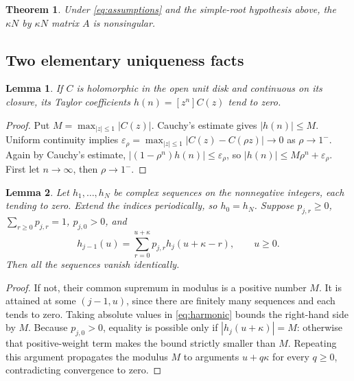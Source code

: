 \documentclass[11pt]{article}
\newtheorem{theorem}{Theorem}
\newtheorem{lemma}{Lemma}
\begin{document}
\begin{theorem}\label{thm:main}
Under \eqref{eq:assumptions} and the simple-root hypothesis above,
the $\kappa N$ by $\kappa N$ matrix $A$ is nonsingular.
\end{theorem}

\subsection*{Two elementary uniqueness facts}
\begin{lemma}\label{lem:coefficients}
If $C$ is holomorphic in the open unit disk and continuous on its
closure, its Taylor coefficients $h(n)=[z^n]C(z)$ tend to zero.
\end{lemma}
\begin{proof}
Put $M=\max_{|z|\leq1}|C(z)|$. Cauchy's estimate gives $|h(n)|\leq M$.
Uniform continuity implies
$\varepsilon_\rho=\max_{|z|\leq1}|C(z)-C(\rho z)|\to0$ as
$\rho\to1^-$. Again by Cauchy's estimate,
$|(1-\rho^n)h(n)|\leq\varepsilon_\rho$, so
$|h(n)|\leq M\rho^n+\varepsilon_\rho$.
First let $n\to\infty$, then $\rho\to1^-$.
\end{proof}

\begin{lemma}\label{lem:maximum}
Let $h_1,\ldots,h_N$ be complex sequences on the nonnegative
integers, each tending to zero. Extend the indices periodically,
so $h_0=h_N$. Suppose $p_{j,r}\geq0$,
$\sum_{r\geq0}p_{j,r}=1$, $p_{j,0}>0$, and
\begin{equation}\label{eq:harmonic}
 h_{j-1}(u)=\sum_{r=0}^{u+\kappa}
                 p_{j,r}h_j(u+\kappa-r),\qquad u\geq0.
\end{equation}
Then all the sequences vanish identically.
\end{lemma}
\begin{proof}
If not, their common supremum in modulus is a positive number $M$.
It is attained at some $(j-1,u)$, since there are finitely many
sequences and each tends to zero. Taking absolute values in
\eqref{eq:harmonic} bounds the right-hand side by $M$.
Because $p_{j,0}>0$, equality is possible only if
$|h_j(u+\kappa)|=M$: otherwise that positive-weight term makes
the bound strictly smaller than $M$. Repeating this argument
propagates the modulus $M$ to arguments $u+q\kappa$ for every
$q\geq0$, contradicting convergence to zero.
\end{proof}
\end{document}
